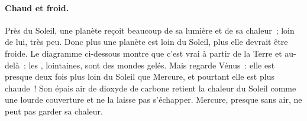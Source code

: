 \paragraph{Chaud et froid.} Près du Soleil, une planète reçoit beaucoup de
sa lumière et de sa chaleur~; loin de lui, très peu. Donc plus une planète
est loin du Soleil, plus elle devrait être froide. Le diagramme ci-dessous
montre que c'est vrai à partir de la Terre et au-delà~: les , lointaines, sont des mondes gelés. Mais regarde Vénus~: elle est
presque deux fois plus loin du Soleil que Mercure, et pourtant elle est
plus chaude~! Son épais air de dioxyde de carbone retient la chaleur du
Soleil comme une lourde couverture et ne la laisse pas s'échapper. Mercure,
presque sans air, ne peut pas garder sa chaleur.


